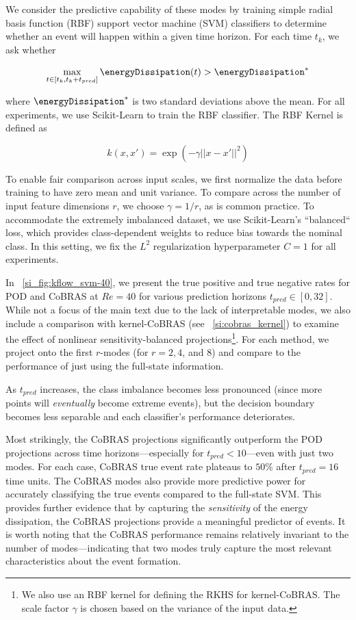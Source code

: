 \documentclass[twocolumn,10pt]{article}
\begin{document}
We consider the predictive capability of these modes by training simple radial basis function (RBF) support vector machine (SVM) classifiers to determine whether an event will happen within a given time horizon. For each time $t_k$, we ask whether 

\begin{equation}
    \max_{t \in [t_k,t_k + t_{pred}]} \energyDissipation(t) > \energyDissipation^*
\end{equation}

\noindent where $\energyDissipation^*$ is two standard deviations above the mean. For all experiments, we use Scikit-Learn \cite{pedregosa2011scikit} to train the RBF classifier. The RBF Kernel is defined as 

$$
    k(x,x') = \exp(-\gamma ||x - x'||^2)
$$

To enable fair comparison across input scales, we first normalize the data before training to have zero mean and unit variance. To compare across the number of input feature dimensions $r$, we choose $\gamma = 1/r$, as is common practice. 
%
To accommodate the extremely imbalanced dataset, we use Scikit-Learn's ``balanced`` loss, which provides class-dependent weights to reduce bias towards the nominal class.
%
In this setting, we fix the $L^2$ regularization hyperparameter $C=1$ for all experiments. 


In \figurename ~\ref{si_fig:kflow_svm-40}, we present the true positive and true negative rates for POD and CoBRAS at $Re=40$ for various prediction horizons $t_{pred} \in [0, 32]$. While not a focus of the main text due to the lack of interpretable modes, we also include a comparison with kernel-CoBRAS (see ~\ref{si:cobras_kernel}) to examine the effect of nonlinear sensitivity-balanced projections\footnote{
%
We also use an RBF kernel for defining the RKHS for kernel-CoBRAS. The scale factor $\gamma$ is chosen based on the variance of the input data. 
}. For each method, we project onto the first  $r$-modes (for $r=2,4$, and $8$) and compare to the performance of just using the full-state information.


As $t_{pred}$ increases, the class imbalance becomes less pronounced (since more points will \textit{eventually} become extreme events), but the decision boundary becomes less separable and each classifier's performance deteriorates.

Most strikingly, the CoBRAS projections significantly outperform the POD projections across time horizons---especially for  $t_{pred} < 10$---even with just two modes. For each case, CoBRAS true event rate plateaus to $50\%$ after $t_{pred}=16$ time units. The CoBRAS modes also provide more predictive power for accurately classifying the true events compared to the full-state SVM. This provides further evidence that by capturing the \textit{sensitivity} of the energy dissipation, the CoBRAS projections provide a meaningful predictor of events. 
It is worth noting that the CoBRAS performance remains relatively invariant to the number of modes---indicating that two modes truly capture the most relevant characteristics about the event formation.
\end{document}

